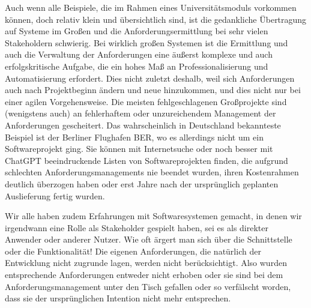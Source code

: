 Auch wenn alle Beispiele, die im Rahmen eines Universitätsmoduls vorkommen können, doch relativ klein und übersichtlich sind, ist die gedankliche Übertragung auf Systeme im Großen und die Anforderungsermittlung bei sehr vielen Stakeholdern schwierig. Bei wirklich großen Systemen ist die Ermittlung und auch die Verwaltung der Anforderungen eine äußerst komplexe und auch erfolgskritische Aufgabe, die ein hohes Maß an Professionalisierung und Automatisierung erfordert. Dies nicht zuletzt deshalb, weil sich Anforderungen auch nach Projektbeginn ändern und neue hinzukommen, und dies nicht nur bei einer agilen Vorgehensweise. Die meisten fehlgeschlagenen Großprojekte sind (wenigstens auch) an fehlerhaftem oder unzureichendem Management der Anforderungen gescheitert. Das wahrscheinlich in Deutschland bekannteste Beispiel ist der Berliner Flughafen BER, wo es allerdings nicht um ein Softwareprojekt ging. Sie können mit Internetsuche oder noch besser mit ChatGPT beeindruckende Listen von Softwareprojekten finden, die aufgrund schlechten Anforderungsmanagements nie beendet wurden, ihren Kostenrahmen deutlich überzogen haben oder erst Jahre nach der ursprünglich geplanten Auslieferung fertig
\linebreak %
wurden.

\pagebreak %

Wir alle haben zudem Erfahrungen mit Softwaresystemen gemacht, in denen wir irgendwann eine Rolle als Stakeholder gespielt haben, sei es als direkter Anwender oder anderer Nutzer. Wie oft ärgert man sich über die Schnittstelle oder die Funktionalität! Die eigenen Anforderungen, die natürlich der Entwicklung nicht zugrunde lagen, werden nicht berücksichtigt. Also wurden entsprechende Anforderungen entweder nicht erhoben oder sie sind bei dem Anforderungsmanagement unter den Tisch gefallen oder so verfälscht worden, dass sie der ursprünglichen Intention nicht mehr entsprechen.